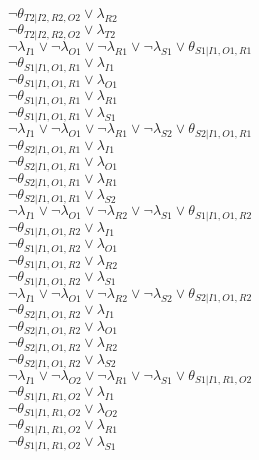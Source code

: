 $\neg\theta_{T2|I2,R2,O2} \vee \lambda_{R2}$\\
$\neg\theta_{T2|I2,R2,O2} \vee \lambda_{T2}$\\
$\neg\lambda_{I1} \vee \neg\lambda_{O1} \vee \neg\lambda_{R1} \vee \neg\lambda_{S1} \vee \theta_{S1|I1,O1,R1}$\\
$\neg\theta_{S1|I1,O1,R1} \vee \lambda_{I1}$\\
$\neg\theta_{S1|I1,O1,R1} \vee \lambda_{O1}$\\
$\neg\theta_{S1|I1,O1,R1} \vee \lambda_{R1}$\\
$\neg\theta_{S1|I1,O1,R1} \vee \lambda_{S1}$\\
$\neg\lambda_{I1} \vee \neg\lambda_{O1} \vee \neg\lambda_{R1} \vee \neg\lambda_{S2} \vee \theta_{S2|I1,O1,R1}$\\
$\neg\theta_{S2|I1,O1,R1} \vee \lambda_{I1}$\\
$\neg\theta_{S2|I1,O1,R1} \vee \lambda_{O1}$\\
$\neg\theta_{S2|I1,O1,R1} \vee \lambda_{R1}$\\
$\neg\theta_{S2|I1,O1,R1} \vee \lambda_{S2}$\\
$\neg\lambda_{I1} \vee \neg\lambda_{O1} \vee \neg\lambda_{R2} \vee \neg\lambda_{S1} \vee \theta_{S1|I1,O1,R2}$\\
$\neg\theta_{S1|I1,O1,R2} \vee \lambda_{I1}$\\
$\neg\theta_{S1|I1,O1,R2} \vee \lambda_{O1}$\\
$\neg\theta_{S1|I1,O1,R2} \vee \lambda_{R2}$\\
$\neg\theta_{S1|I1,O1,R2} \vee \lambda_{S1}$\\
$\neg\lambda_{I1} \vee \neg\lambda_{O1} \vee \neg\lambda_{R2} \vee \neg\lambda_{S2} \vee \theta_{S2|I1,O1,R2}$\\
$\neg\theta_{S2|I1,O1,R2} \vee \lambda_{I1}$\\
$\neg\theta_{S2|I1,O1,R2} \vee \lambda_{O1}$\\
$\neg\theta_{S2|I1,O1,R2} \vee \lambda_{R2}$\\
$\neg\theta_{S2|I1,O1,R2} \vee \lambda_{S2}$\\
$\neg\lambda_{I1} \vee \neg\lambda_{O2} \vee \neg\lambda_{R1} \vee \neg\lambda_{S1} \vee \theta_{S1|I1,R1,O2}$\\
$\neg\theta_{S1|I1,R1,O2} \vee \lambda_{I1}$\\
$\neg\theta_{S1|I1,R1,O2} \vee \lambda_{O2}$\\
$\neg\theta_{S1|I1,R1,O2} \vee \lambda_{R1}$\\
$\neg\theta_{S1|I1,R1,O2} \vee \lambda_{S1}$\\
